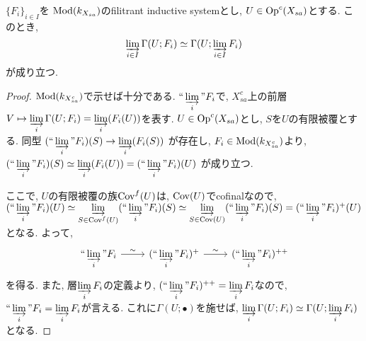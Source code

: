 \documentclass[../main]{subfiles}
\begin{document}
\begin{prop}
  $\{F_i\}_{i\in I}$を
  $\Mod(k_{X_{sa}})$のfilitrant inductive systemとし,
  $U\in\Op^c(X_{sa})$とする.
  このとき,
  \[
    \ilim[i\in I] \Gamma(U ; F_i)
    \simeq
    \Gamma(U ; \ilim[i\in I] F_i)
  \]
  が成り立つ.
\end{prop}
\begin{proof}
  $\Mod(k_{X_{sa}^c})$で示せば十分である.
  $\iilim[i] F_i$で, 
  $X_{sa}^c$上の前層
  $V\mapsto \ilim[i] \Gamma(U;F_i) = \ilim[i] ( F_i(U) )$を表す.
  $U\in\Op^c(X_{sa})$とし,
  $S$を$U$の有限被覆とする.
  同型
  $(\iilim[i] F_i)(S) \to \ilim[i] ( F_i(S) ) $
  が存在し,
  $F_i\in\Mod(k_{X_{sa}^c})$より,
  $(\iilim[i] F_i)(S) \simeq \ilim[i] ( F_i(U) ) =  (\iilim[i] F_i)(U)$
  が成り立つ.

  ここで, $U$の有限被覆の族$\Cov^f(U)$は, $\Cov(U)$でcofinalなので,
  $
  (\iilim[i] F_i)(U)
  \simeq \ilim[S\in\Cov^f(U)] (\iilim[i]F_i)(S)
  \simeq \ilim[S\in\Cov(U)] (\iilim[i]F_i)(S)
  = (\iilim[i] F_i)^+(U)
  $
  となる.
  よって,
  \[
    \begin{tikzcd}
      \iilim[i] F_i \ar[r,"\sim"]
      & (\iilim[i] F_i)^+ \ar[r,"\sim"]
      & (\iilim[i] F_i)^{++}
    \end{tikzcd}
  \]
  を得る.
  また, 層$\ilim[i] F_i$の定義より,
  $(\iilim[i] F_i)^{++}=\ilim[i] F_i$なので,
  $\iilim[i] F_i = \ilim[i] F_i$が言える.
  これに$\Gamma(U;\bullet)$を施せば,
  $\ilim[i]\Gamma(U;F_i) \simeq \Gamma(U;\ilim[i]F_i)$となる.
\end{proof}
\end{document}
